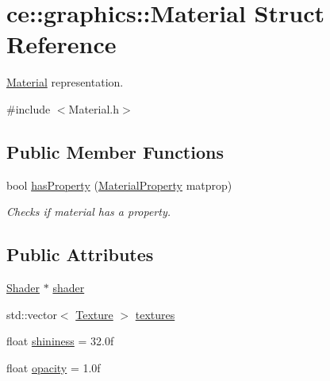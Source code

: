 \hypertarget{structce_1_1graphics_1_1_material}{}\section{ce\+:\+:graphics\+:\+:Material Struct Reference}
\label{structce_1_1graphics_1_1_material}


\hyperlink{structce_1_1graphics_1_1_material}{Material} representation.  




{\ttfamily \#include $<$Material.\+h$>$}

\subsection*{Public Member Functions}
\begin{DoxyCompactItemize}
\item 
\mbox{\label{structce_1_1graphics_1_1_material_af33c976594ddcca02b16b7fbf64d429a}} 
bool \hyperlink{structce_1_1graphics_1_1_material_af33c976594ddcca02b16b7fbf64d429a}{has\+Property} (\hyperlink{_material_8h_aac4ec325697a8f788007e105d586d217}{Material\+Property} matprop)
\begin{DoxyCompactList}\small\item\em Checks if material has a property. \end{DoxyCompactList}\end{DoxyCompactItemize}
\subsection*{Public Attributes}
\begin{DoxyCompactItemize}
\item 
\hyperlink{classce_1_1graphics_1_1_shader}{Shader} $\ast$ \hyperlink{structce_1_1graphics_1_1_material_a3451761d37b0d7e42a0bd075b163aa8e}{shader}
\item 
std\+::vector$<$ \hyperlink{structce_1_1graphics_1_1_texture}{Texture} $>$ \hyperlink{structce_1_1graphics_1_1_material_ad14fc2a8d3a7d9241226471f8f2e2fcc}{textures}
\item 
float \hyperlink{structce_1_1graphics_1_1_material_a62ed7d4af263dbdd7065a9b664bfab6e}{shininess} = 32.\+0f
\item 
float \hyperlink{structce_1_1graphics_1_1_material_ad6f3a5c250e374b47ca6bbefb75b8a6c}{opacity} = 1.\+0f
\end{DoxyCompactItemize}
